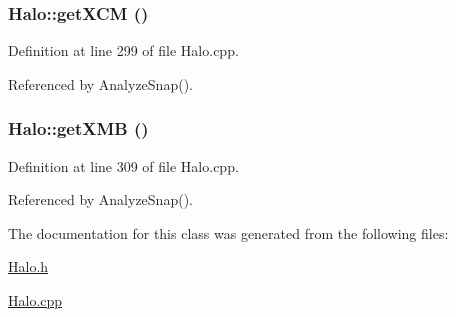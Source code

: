 \subsubsection[{getXCM}]{ Halo::getXCM ()}\label{classHalo_aaa531bfdbdff8f5f6aea7f82e260fcaf}


Definition at line 299 of file Halo.cpp.



Referenced by AnalyzeSnap().

\subsubsection[{getXMB}]{ Halo::getXMB ()}\label{classHalo_a7f3f8b61f172eb1af5a57721a8a9abae}


Definition at line 309 of file Halo.cpp.



Referenced by AnalyzeSnap().



The documentation for this class was generated from the following files:\begin{DoxyCompactItemize}
\item 
\hyperlink{Halo_8h}{Halo.h}\item 
\hyperlink{Halo_8cpp}{Halo.cpp}\end{DoxyCompactItemize}
